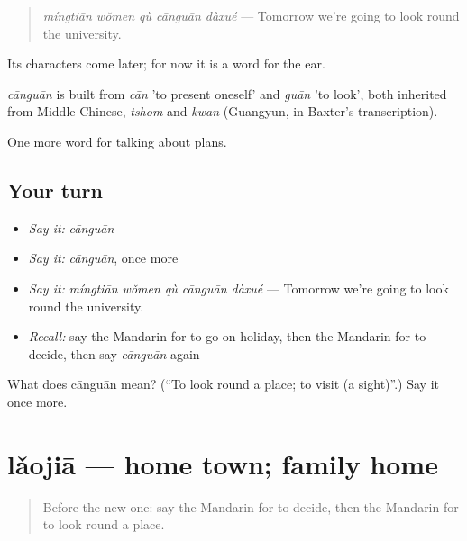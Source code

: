 \begin{quote}
\emph{míngtiān wǒmen qù cānguān dàxué} — Tomorrow we're going to look round the university.
\end{quote}

Its characters come later; for now it is a word for the ear.

\begin{cousinweb}
\emph{cānguān} is built from \emph{cān} 'to present oneself' and \emph{guān} 'to look', both inherited from Middle Chinese, \emph{tshom} and \emph{kwan} (Guangyun, in Baxter's transcription).
\end{cousinweb}

\begin{grammarlens}[title={What you've built}]
One more word for talking about plans.
\end{grammarlens}

\subsection*{Your turn}
\begin{itemize}
\raggedright
  \item \emph{Say it:} \emph{cānguān}
  \item \emph{Say it:} \emph{cānguān}, once more
  \item \emph{Say it:} \emph{míngtiān wǒmen qù cānguān dàxué} — Tomorrow we're going to look round the university.
  \item \emph{Recall:} say the Mandarin for to go on holiday, then the Mandarin for to decide, then say \emph{cānguān} again
\end{itemize}

\begin{tcolorbox}[breakable,colback=teal!4,colframe=teal!35!black,title={Before you move on}]
What does cānguān mean? (\textquotedblleft{}To look round a place; to visit (a sight)\textquotedblright{}.) Say it once more.
\end{tcolorbox}
\section[lǎojiā]{lǎojiā — home town; family home}

\label{lesson:ZH-C184-laojia}



\begin{quote}
Before the new one: say the Mandarin for to decide, then the Mandarin for to look round a place.
\end{quote}

